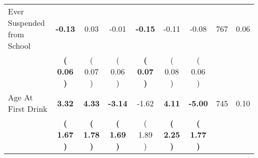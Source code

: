 \begin{tabular}{lcccccccc}
Ever Suspended from School & \textbf{    -0.13} &      0.03 &     -0.01 & \textbf{    -0.15} &     -0.11 &     -0.08 & 767 &       0.06 \\ 
 & \textbf{(     0.06 )} & (     0.07 ) & (     0.06 ) & \textbf{(     0.07 )} & (     0.08 ) & (     0.06 ) & \\
Age At First Drink & \textbf{     3.32} & \textbf{     4.33} & \textbf{    -3.14} &     -1.62 & \textbf{     4.11} & \textbf{    -5.00} & 745 &       0.10 \\ 
 & \textbf{(     1.67 )} & \textbf{(     1.78 )} & \textbf{(     1.69 )} & (     1.89 ) & \textbf{(     2.25 )} & \textbf{(     1.77 )} & \\
\bottomrule
\end{tabular}
